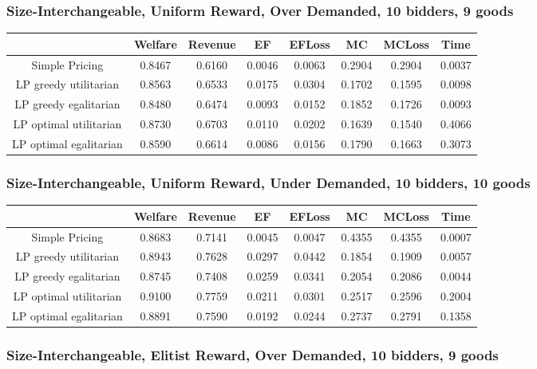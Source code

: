 \subsubsection*{Size-Interchangeable, Uniform Reward, Over Demanded, 10 bidders, 9 goods} 
\begin{tabular}{|c|c|c|c|c|c|c|c|}\hline
                            	&Welfare	&Revenue	&EF	&EFLoss	&MC	&MCLoss	&Time	\\\hline
                Simple Pricing	&0.8467	&0.6160	&0.0046	&0.0063	&0.2904	&0.2904	&0.0037	\\\hline 
         LP greedy utilitarian	&0.8563	&0.6533	&0.0175	&0.0304	&0.1702	&0.1595	&0.0098	\\\hline 
         LP greedy egalitarian	&0.8480	&0.6474	&0.0093	&0.0152	&0.1852	&0.1726	&0.0093	\\\hline 
        LP optimal utilitarian	&0.8730	&0.6703	&0.0110	&0.0202	&0.1639	&0.1540	&0.4066	\\\hline 
        LP optimal egalitarian	&0.8590	&0.6614	&0.0086	&0.0156	&0.1790	&0.1663	&0.3073	\\\hline 
\end{tabular}\subsubsection*{Size-Interchangeable, Uniform Reward, Under Demanded, 10 bidders, 10 goods} 
\begin{tabular}{|c|c|c|c|c|c|c|c|}\hline
                            	&Welfare	&Revenue	&EF	&EFLoss	&MC	&MCLoss	&Time	\\\hline
                Simple Pricing	&0.8683	&0.7141	&0.0045	&0.0047	&0.4355	&0.4355	&0.0007	\\\hline 
         LP greedy utilitarian	&0.8943	&0.7628	&0.0297	&0.0442	&0.1854	&0.1909	&0.0057	\\\hline 
         LP greedy egalitarian	&0.8745	&0.7408	&0.0259	&0.0341	&0.2054	&0.2086	&0.0044	\\\hline 
        LP optimal utilitarian	&0.9100	&0.7759	&0.0211	&0.0301	&0.2517	&0.2596	&0.2004	\\\hline 
        LP optimal egalitarian	&0.8891	&0.7590	&0.0192	&0.0244	&0.2737	&0.2791	&0.1358	\\\hline 
\end{tabular}\subsubsection*{Size-Interchangeable, Elitist Reward, Over Demanded, 10 bidders, 9 goods} 
